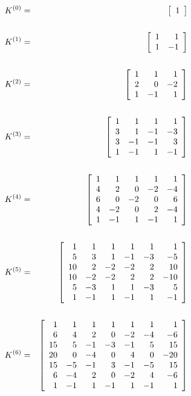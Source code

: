 \documentclass[12pt]{article}
\def\KM{K}
\numberwithin{equation}{section}
\begin{document}
\begin{eqnarray*}
%
\KM^{(0)}&=&\left[\begin{array}{r} 1 \end{array}\right]   
\\
\\
\KM^{(1)}&=&\left[\begin{array}{rr} 1 &  1 \cr
                           1 & -1 \cr\end{array}\right]    
\\
\\
\KM^{(2)}&=& \left[\begin{array}{rrr}  1 &  1 &  1 \cr
                             2 &  0 & -2 \cr
                             1 & -1 &  1 \cr \end{array}\right]
\\
\\
\KM^{(3)}&=&
       \left[\begin{array}{rrrr}
                      1 &  1 &  1  &  1 \cr
                      3 &  1 & -1  & -3 \cr
                      3 & -1 & -1  &  3 \cr
                      1 & -1 &  1  & -1 \cr 
             \end{array}\right]
\\
\\
\KM^{(4)}&=&
       \left[\begin{array}{rrrrr} 1 &  1 &  1  &  1  &  1 \cr
                      4 &  2 &  0  & -2  & -4 \cr
                      6 &  0 & -2  &  0  &  6 \cr
                      4 & -2 &  0  &  2  & -4 \cr
                      1 & -1 &  1  & -1  &  1 \cr \end{array}\right]
\\
\\
\KM^{(5)}&=&
       \left[\begin{array}{rrrrrr} 1  &  1 &  1  &  1  &  1 &   1 \cr
                      5  &  3 &  1  & -1  & -3 &  -5 \cr
                     10  &  2 & -2  & -2  &  2 &  10 \cr
                     10  & -2 & -2  &  2  &  2 & -10 \cr
                      5  & -3 &  1  &  1  & -3 &   5 \cr
                      1  & -1 &  1  & -1  &  1 &  -1 \cr \end{array}\right]
\\
\\
\KM^{(6)}&=&
       \left[\begin{array}{rrrrrrr} 
                      1  &  1 &  1  &  1  &  1 &  1  &   1 \cr
                      6  &  4 &  2  &  0  & -2 & -4  &  -6 \cr
                     15  &  5 & -1  & -3  & -1 &  5  &  15 \cr
                     20  &  0 & -4  &  0  &  4 &  0  & -20 \cr
                     15  & -5 & -1  &  3  & -1 & -5  &  15 \cr
                      6  & -4 &  2  &  0  & -2 &  4  &  -6 \cr
                      1  & -1 &  1  & -1  &  1 & -1  &   1 \cr
\end{array}\right] 
\end{eqnarray*}
\end{document}
